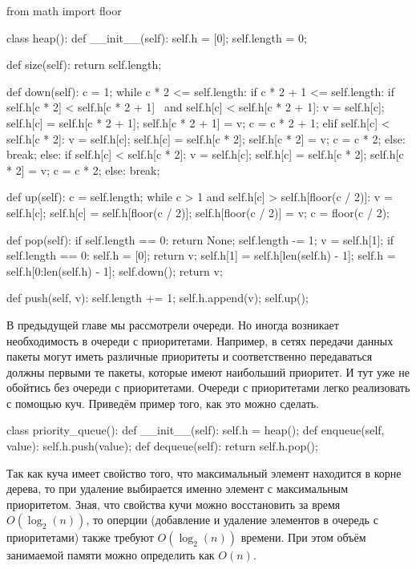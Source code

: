 \begin{python}
from math import floor

class heap():
	def __init__(self):
		self.h = [0];
		self.length = 0;

	def size(self):
		return self.length;

	def down(self):
		c = 1;
		while c * 2 <= self.length:
			if c * 2 + 1 <= self.length:
				if self.h[c * 2] < self.h[c * 2 + 1] \
					and self.h[c] < self.h[c * 2 + 1]:
					v = self.h[c];
					self.h[c] = self.h[c * 2 + 1];
					self.h[c * 2 + 1] = v;
					c = c * 2 + 1;
				elif self.h[c] < self.h[c * 2]:
					v = self.h[c];
					self.h[c] = self.h[c * 2];
					self.h[c * 2] = v;
					c = c * 2;
				else:
					break;
			else:
				if self.h[c] < self.h[c * 2]:
					v = self.h[c];
					self.h[c] = self.h[c * 2];
					self.h[c * 2] = v;
					c = c * 2;
				else:
					break;

	def up(self):
		c = self.length;
		while c > 1 and self.h[c] > self.h[floor(c / 2)]:
			v = self.h[c];
			self.h[c] = self.h[floor(c / 2)];
			self.h[floor(c / 2)] = v;
			c = floor(c / 2);

	def pop(self):
		if self.length == 0:
			return None;
		self.length -= 1;
		v = self.h[1];
		if self.length == 0:
			self.h = [0];
			return v;
		self.h[1] = self.h[len(self.h) - 1];
		self.h = self.h[0:len(self.h) - 1];
		self.down();
		return v;

	def push(self, v):
		self.length += 1;
		self.h.append(v);
		self.up();
\end{python}

В предыдущей главе мы рассмотрели очереди. Но иногда возникает необходимость
в очереди с приоритетами. Например, в сетях передачи данных пакеты могут 
иметь различные приоритеты и соответственно передаваться должны первыми те
пакеты, которые имеют наибольший приоритет. И тут уже не обойтись без очереди 
с приоритетами. Очереди с приоритетами легко реализовать с помощью 
куч. Приведём пример того, как это можно сделать.

\begin{python}
class priority_queue():
	def __init__(self):
		self.h = heap();
	def enqueue(self, value):
		self.h.push(value);
	def dequeue(self):
		return self.h.pop();
\end{python}

Так как куча имеет свойство того, что максимальный элемент находится 
в корне дерева, то при удаление выбирается именно элемент с 
максимальным приоритетом. Зная, что свойства кучи можно восстановить
за время $O(\log_2(n))$, то оперции (добавление и удаление элементов 
в очередь с приоритетами) также требуют $O(\log_2(n))$ времени. При этом 
объём занимаемой памяти можно определить как $O(n)$.


